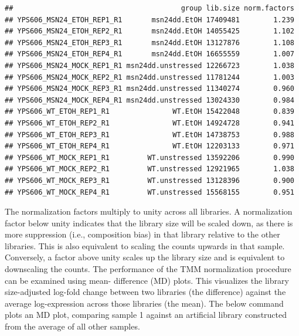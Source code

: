 \documentclass[
]{book}
\newenvironment{Shaded}{\begin{snugshade}}{\end{snugshade}}
\newcommand{\AttributeTok}[1]{\textcolor[rgb]{0.13,0.29,0.53}{#1}}
\newcommand{\ConstantTok}[1]{\textcolor[rgb]{0.56,0.35,0.01}{#1}}
\newcommand{\ControlFlowTok}[1]{\textcolor[rgb]{0.13,0.29,0.53}{\textbf{#1}}}
\newcommand{\DecValTok}[1]{\textcolor[rgb]{0.00,0.00,0.81}{#1}}
\newcommand{\FunctionTok}[1]{\textcolor[rgb]{0.13,0.29,0.53}{\textbf{#1}}}
\newcommand{\NormalTok}[1]{#1}
\newcommand{\SpecialCharTok}[1]{\textcolor[rgb]{0.81,0.36,0.00}{\textbf{#1}}}
\newcommand{\StringTok}[1]{\textcolor[rgb]{0.31,0.60,0.02}{#1}}
\begin{document}
\begin{verbatim}
##                                        group lib.size norm.factors
## YPS606_MSN24_ETOH_REP1_R1       msn24dd.EtOH 17409481        1.239
## YPS606_MSN24_ETOH_REP2_R1       msn24dd.EtOH 14055425        1.102
## YPS606_MSN24_ETOH_REP3_R1       msn24dd.EtOH 13127876        1.108
## YPS606_MSN24_ETOH_REP4_R1       msn24dd.EtOH 16655559        1.007
## YPS606_MSN24_MOCK_REP1_R1 msn24dd.unstressed 12266723        1.038
## YPS606_MSN24_MOCK_REP2_R1 msn24dd.unstressed 11781244        1.003
## YPS606_MSN24_MOCK_REP3_R1 msn24dd.unstressed 11340274        0.960
## YPS606_MSN24_MOCK_REP4_R1 msn24dd.unstressed 13024330        0.984
## YPS606_WT_ETOH_REP1_R1               WT.EtOH 15422048        0.839
## YPS606_WT_ETOH_REP2_R1               WT.EtOH 14924728        0.941
## YPS606_WT_ETOH_REP3_R1               WT.EtOH 14738753        0.988
## YPS606_WT_ETOH_REP4_R1               WT.EtOH 12203133        0.971
## YPS606_WT_MOCK_REP1_R1         WT.unstressed 13592206        0.990
## YPS606_WT_MOCK_REP2_R1         WT.unstressed 12921965        1.038
## YPS606_WT_MOCK_REP3_R1         WT.unstressed 13128396        0.900
## YPS606_WT_MOCK_REP4_R1         WT.unstressed 15568155        0.951
\end{verbatim}

The normalization factors multiply to unity across all libraries. A
normalization factor below unity indicates that the library size will be
scaled down, as there is more suppression (i.e., composition bias) in
that library relative to the other libraries. This is also equivalent to
scaling the counts upwards in that sample. Conversely, a factor above
unity scales up the library size and is equivalent to downscaling the
counts. The performance of the TMM normalization procedure can be
examined using mean- difference (MD) plots. This visualizes the library
size-adjusted log-fold change between two libraries (the difference)
against the average log-expression across those libraries (the mean).
The below command plots an MD plot, comparing sample 1 against an
artificial library constructed from the average of all other samples.

\begin{Shaded}
\end{Shaded}
\end{document}
